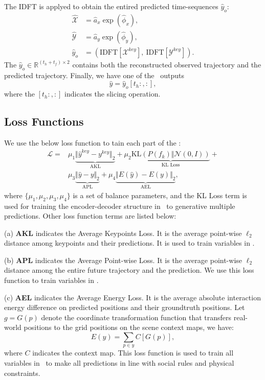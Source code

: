 \documentclass[../paper.tex]{subfiles}
\begin{document}
The IDFT is applyed to obtain the entired predicted time-sequences $\hat{y}_o$:
\begin{equation}
    \begin{aligned}
        \hat{\mathcal{X}} &= \hat{a}_x \exp(\hat{\phi}_x), \\
        \hat{\mathcal{Y}} &= \hat{a}_y \exp(\hat{\phi}_y), \\
        \hat{y}_o &= \left(\mbox{IDFT}[\mathcal{X}^{key}],~\mbox{IDFT}[\mathcal{Y}^{key}]\right).
    \end{aligned}
\end{equation}
The $\hat{y}_o \in \mathbb{R}^{(t_h + t_f) \times 2}$ contains both the reconstructed observed trajectory and the predicted trajectory.
Finally, we have one of the \MODEL~outputs
\begin{equation}
    \hat{y} = \hat{y}_o [t_h:, :],
\end{equation}
where the $[t_h:, :]$ indicates the slicing operation.

\subsection{Loss Functions}

We use the below loss function to tain each part of the \MODEL:
\begin{equation}
    \begin{aligned}
        \mathcal{L} =& \mu_1 \underbrace{\Vert \hat{y}^{key} - y^{key} \Vert_2}_{\mbox{AKL}} + \mu_2 \underbrace{\mbox{KL}(P(f_k) \Vert \mathcal{N}(0, I))}_{\mbox{KL Loss}} + \\
        &\mu_3 \underbrace{\Vert \hat{y} - y \Vert_2}_{\mbox{APL}} + \mu_4 \underbrace{\Vert E(\hat{y}) - E(y) \Vert_2}_{\mbox{AEL}},
    \end{aligned}  
\end{equation}
where $\{\mu_1, \mu_2, \mu_3, \mu_4\}$ is a set of balance parameters, and the KL Loss term is used for training the encoder-decoder structure in \ALPHAMODEL~to generative multiple predictions.
Other loss function terms are listed below:

(a) \textbf{AKL} indicates the Average Keypoints Loss.
It is the average point-wise $\ell_2$ distance among keypoints and their predictions.
It is used to train variables in \ALPHAMODEL.

(b) \textbf{APL} indicates the Average Point-wise Loss.
It is the average point-wise $\ell_2$ distance among the entire future trajectory and the prediction.
We use this loss function to train variables in \BETAMODEL.

(c) \textbf{AEL} indicates the Average Energy Loss.
It is the average absolute interaction energy difference on predicted positions and their groundtruth positions.
Let $g = G(p)$ denote the coordinate transformation function that transfers real-world positions to the grid positions on the scene context maps, we have:
\begin{equation}
    E(y) = \sum_{p \in y}C[G(p)],
\end{equation}
where $C$ indicates the context map.
This loss function is used to train all variables in \MODEL~to make all predictions in line with social rules and physical constraints.
\end{document}
